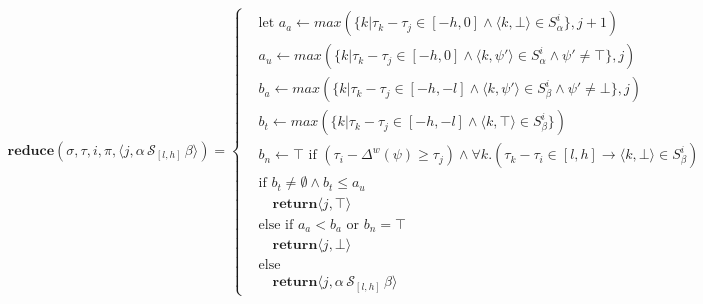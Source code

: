 \documentclass[10pt,a4paper]{article}
\newcommand{\rp}[2]{\ensuremath{\langle #1, #2 \rangle}}
\begin{document}
\begin{align*}
\mathbf{reduce}(\sigma,\tau, i,\pi,\rp{j}{\alpha\, \mathcal{S}_{[l,h]}\, \beta}) = \left\{
\begin{aligned}
&\text{let } a_a \leftarrow max(\{k | \tau_k - \tau_j \in [-h, 0] \wedge \rp{k}{\bot} \in S^i_{\alpha} \}, j+1)  \\
&a_u \leftarrow max(\{k | \tau_k - \tau_j \in [-h, 0] \wedge  \rp{k}{\psi'} \in S^i_{\alpha} \wedge \psi' \neq \top \}, j) \\
&b_a \leftarrow max(\{k | \tau_k - \tau_j \in [-h, -l] \wedge \rp{k}{\psi'} \in S^i_{\beta} \wedge \psi' \neq \bot \}, j)  \\
&b_t \leftarrow max(\{k | \tau_k - \tau_j \in [-h, -l] \wedge \rp{k}{\top} \in S^i_{\beta} \}) \\
&b_n \leftarrow \top \text{ if } (\tau_i - \Delta^w(\psi) \geq \tau_j) \wedge \forall k.(\tau_k - \tau_i \in [l,h] \rightarrow \rp{k}{\bot} \in S^i_{\beta}) \\
&\text{if }b_t \neq \emptyset \wedge b_t \leq a_u \\
& \quad\mathbf{return} \rp{j}{\top} \\
&\text{else if } a_a < b_a \text{ or } b_n = \top\\ & \quad\mathbf{return} \rp{j}{\bot} \\
&\text{else} \\
& \quad\mathbf{return} \rp{j}{\alpha\, \mathcal{S}_{[l,h]}\, \beta}
\end{aligned} \right. \\
\end{align*}
\end{document}
